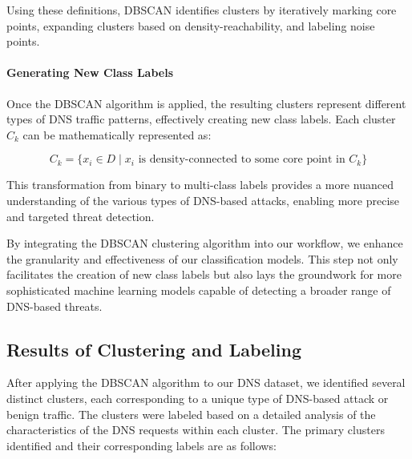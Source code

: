 Using these definitions, DBSCAN identifies clusters by iteratively marking core points, expanding clusters based on density-reachability, and labeling noise points.

\paragraph{Generating New Class Labels}
Once the DBSCAN algorithm is applied, the resulting clusters represent different types of DNS traffic patterns, effectively creating new class labels. Each cluster \(C_k\) can be mathematically represented as:

\[ C_k = \{x_i \in D \mid x_i \text{ is density-connected to some core point in } C_k\} \]

This transformation from binary to multi-class labels provides a more nuanced understanding of the various types of DNS-based attacks, enabling more precise and targeted threat detection.

By integrating the DBSCAN clustering algorithm into our workflow, we enhance the granularity and effectiveness of our classification models. This step not only facilitates the creation of new class labels but also lays the groundwork for more sophisticated machine learning models capable of detecting a broader range of DNS-based threats.




\subsection{Results of Clustering and Labeling}

After applying the DBSCAN algorithm to our DNS dataset, we identified several distinct clusters, each corresponding to a unique type of DNS-based attack or benign traffic. The clusters were labeled based on a detailed analysis of the characteristics of the DNS requests within each cluster. The primary clusters identified and their corresponding labels are as follows:

